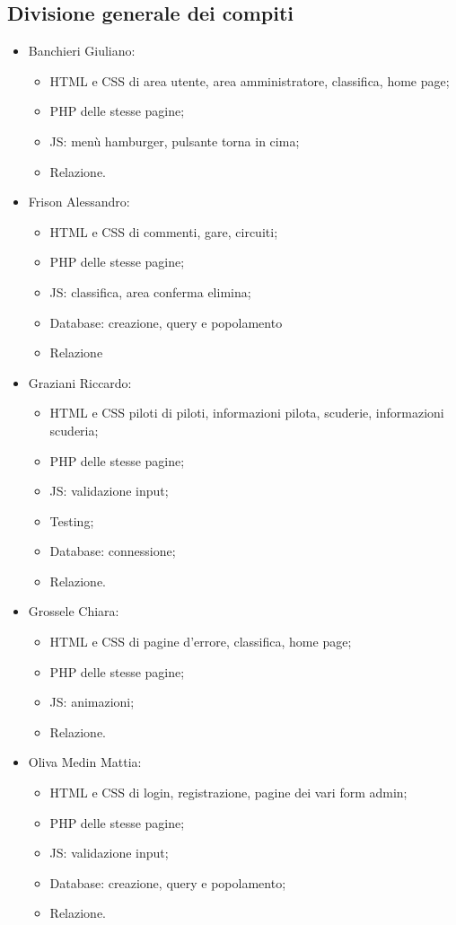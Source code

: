 \documentclass[11pt,a4paper]{article}
\begin{document}
\subsection{Divisione generale dei compiti}
\begin{itemize}
    \item Banchieri Giuliano: 
    \begin{itemize}
        \item HTML e CSS di area utente, area amministratore, classifica, home page;
        \item PHP delle stesse pagine;
        \item JS: menù hamburger, pulsante torna in cima;
        \item Relazione.
    \end{itemize}
    \item Frison Alessandro:
    \begin{itemize}
        \item HTML e CSS di commenti, gare, circuiti;
        \item PHP delle stesse pagine;
        \item JS: classifica, area conferma elimina;
        \item Database: creazione, query e popolamento
        \item Relazione
    \end{itemize}
    \item Graziani Riccardo: 
    \begin{itemize}
        \item HTML e CSS piloti di piloti, informazioni pilota, scuderie, informazioni scuderia;
        \item PHP delle stesse pagine;
        \item JS: validazione input;
        \item Testing;
        \item Database: connessione;
        \item Relazione.
    \end{itemize}
    \item Grossele Chiara: 
    \begin{itemize}
        \item HTML e CSS di pagine d'errore, classifica, home page;
        \item PHP delle stesse pagine;
        \item JS: animazioni;
        \item Relazione.
    \end{itemize}
    \item Oliva Medin Mattia: 
    \begin{itemize}
        \item HTML e CSS di login, registrazione, pagine dei vari form admin;
        \item PHP delle stesse pagine;
        \item JS: validazione input;
        \item Database: creazione, query e popolamento;
        \item Relazione.
    \end{itemize}
    
\end{itemize}
\end{document}
